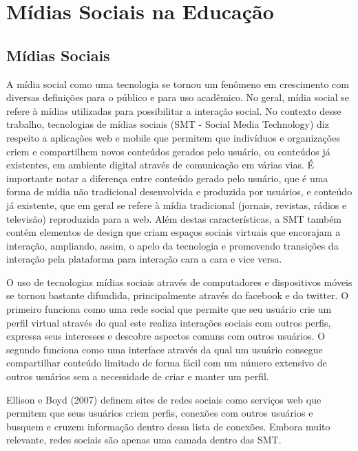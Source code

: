 \chapter{Mídias Sociais na Educação}
\label{cap:midias-sociais}

\section{Mídias Sociais}

A mídia social como uma tecnologia se tornou um fenômeno em crescimento com
diversas definições para o público e para uso acadêmico. No geral, mídia social
se refere à mídias utilizadas para possibilitar a interação social. No contexto
desse trabalho, tecnologias de mídias sociais (SMT - Social Media Technology)
diz respeito a aplicações web e mobile que permitem que indivíduos e organizações
criem e compartilhem novos conteúdos gerados pelo usuário, ou conteúdos já
existentes, em ambiente digital através de comunicação em várias vias. É
importante notar a diferença entre conteúdo gerado pelo usuário, que é uma forma
de mídia não tradicional desenvolvida e produzida por usuários, e conteúdo já
existente, que em geral se refere à mídia tradicional (jornais, revistas, rádios
e televisão) reproduzida para a web. Além destas características, a SMT também
contém elementos de design que criam espaços sociais virtuais que encorajam a 
interação, ampliando, assim, o apelo da tecnologia e promovendo transições da 
interação pela plataforma para interação cara a cara e vice versa.

O uso de tecnologias mídias sociais através de computadores e dispositivos móveis
se tornou bastante difundida, principalmente através do facebook e do twitter.
O primeiro funciona como uma rede social que permite que seu usuário crie um 
perfil virtual através do qual este realiza interações sociais com outros perfis,
expressa seus interesses e descobre aspectos comuns com outros usuários. O segundo
funciona como uma interface através da qual um usuário consegue compartilhar
conteúdo limitado de forma fácil com um número extensivo de outros usuários sem
a necessidade de criar e manter um perfil.

Ellison e Boyd (2007) \cite{inmetro2003} 
definem sites de redes sociais como
serviços web que permitem que seus usuários criem perfis, conexões com
outros usuários e busquem e cruzem informação dentro dessa lista de conexões.
Embora muito relevante, redes sociais são apenas uma camada dentro das SMT.

